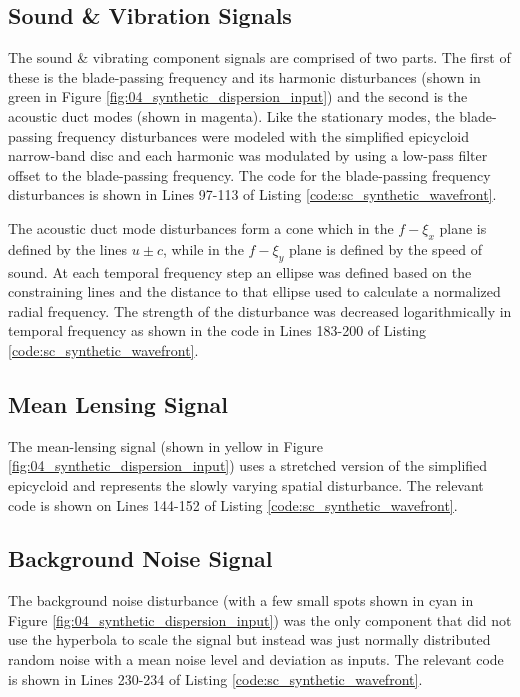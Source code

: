 \subsection{Sound \& Vibration Signals}
The sound \& vibrating component signals are comprised of two parts.
The first of these is the blade-passing frequency and its harmonic disturbances (shown in green in Figure \ref{fig:04_synthetic_dispersion_input}) and the second is the acoustic duct modes (shown in magenta).
Like the stationary modes, the blade-passing frequency disturbances were modeled with the simplified epicycloid narrow-band disc and each harmonic was modulated by using a low-pass filter offset to the blade-passing frequency.
The code for the blade-passing frequency disturbances is shown in Lines 97-113 of Listing \ref{code:sc_synthetic_wavefront}.

The acoustic duct mode disturbances form a cone which in the $f-\xi_x$ plane is defined by the lines $u\pm c$, while in the $f-\xi_y$ plane is defined by the speed of sound.
At each temporal frequency step an ellipse was defined based on the constraining lines and the distance to that ellipse used to calculate a normalized radial frequency.
The strength of the disturbance was decreased logarithmically in temporal frequency as shown in the code in Lines 183-200 of Listing \ref{code:sc_synthetic_wavefront}.

\subsection{Mean Lensing Signal}
The mean-lensing signal (shown in yellow in Figure \ref{fig:04_synthetic_dispersion_input}) uses a stretched version of the simplified epicycloid and represents the slowly varying spatial disturbance.
The relevant code is shown on Lines 144-152 of Listing \ref{code:sc_synthetic_wavefront}.

\subsection{Background Noise Signal}
The background noise disturbance (with a few small spots shown in cyan in Figure \ref{fig:04_synthetic_dispersion_input}) was the only component that did not use the hyperbola to scale the signal but instead was just normally distributed random noise with a mean noise level and deviation as inputs.
The relevant code is shown in Lines 230-234 of Listing \ref{code:sc_synthetic_wavefront}.

